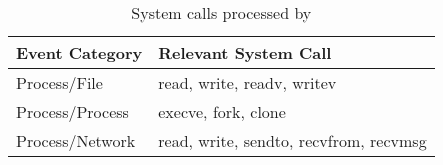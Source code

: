 \begin{table}[t]
\caption{System calls processed by \tool}
\centering
\begin{adjustbox}{width=0.48\textwidth}

\begin{tabular}{|l|l|}
\hline
 \textbf{Event Category}&  \textbf{Relevant System Call}\\ \hline
Process/File & read, write, readv, writev  \\ \hline
Process/Process & execve, fork, clone  \\ \hline
Process/Network & read, write, sendto, recvfrom, recvmsg \\ \hline
\end{tabular}
\end{adjustbox}
\label{tab:events}
\end{table}